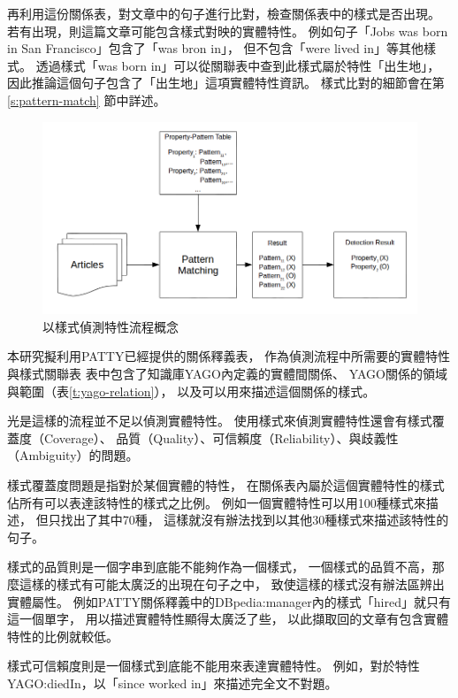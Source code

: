 再利用這份關係表，對文章中的句子進行比對，檢查關係表中的樣式是否出現。
若有出現，則這篇文章可能包含樣式對映的實體特性。
例如句子「Jobs was born in San Francisco」包含了「was bron in」，
但不包含「were lived in」等其他樣式。
透過樣式「was born in」可以從關聯表中查到此樣式屬於特性「出生地」，
因此推論這個句子包含了「出生地」這項實體特性資訊。
樣式比對的細節會在第\ref{s:pattern-match} 節中詳述。

\begin{figure}
    \centering
    \includegraphics[width=1\textwidth]{images/03-process-v1}
    \caption{以樣式偵測特性流程概念}
    \label{i:process-v1}
\end{figure}

本研究擬利用PATTY已經提供的關係釋義表，
作為偵測流程中所需要的實體特性與樣式關聯表
表中包含了知識庫YAGO內定義的實體間關係、
YAGO關係的領域與範圍（表\ref{t:yago-relation}），
以及可以用來描述這個關係的樣式。




光是這樣的流程並不足以偵測實體特性。
使用樣式來偵測實體特性還會有樣式覆蓋度（Coverage）、
品質（Quality）、可信賴度（Reliability）、與歧義性（Ambiguity）的問題。

樣式覆蓋度問題是指對於某個實體的特性，
在關係表內屬於這個實體特性的樣式佔所有可以表達該特性的樣式之比例。
例如一個實體特性可以用100種樣式來描述，
但只找出了其中70種，
這樣就沒有辦法找到以其他30種樣式來描述該特性的句子。

樣式的品質則是一個字串到底能不能夠作為一個樣式，    %
一個樣式的品質不高，那麼這樣的樣式有可能太廣泛的出現在句子之中，
致使這樣的樣式沒有辦法區辨出實體屬性。
例如PATTY關係釋義中的DBpedia:manager內的樣式「hired」就只有這一個單字，
用以描述實體特性顯得太廣泛了些，
以此擷取回的文章有包含實體特性的比例就較低。

樣式可信賴度則是一個樣式到底能不能用來表達實體特性。
例如，對於特性YAGO:diedIn，以「since worked in」來描述完全文不對題。

